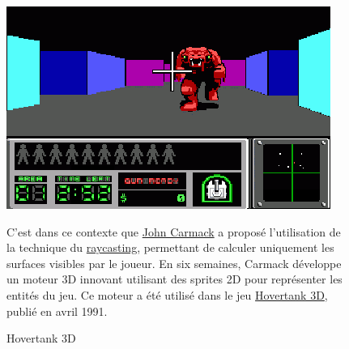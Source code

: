 \documentclass[12pt]{report}
\begin{document}
\begin{figure}[H]
	\begin{minipage}{0.48\textwidth}
		\centering
		\includegraphics[width=\linewidth]{image/Hovertank_3D.png}
		\caption{Hovertank 3D}
		\label{fig:hovertank3d}
	\end{minipage}\hfill
	\begin{minipage}{0.48\textwidth}
		C'est dans ce contexte que \href{https://fr.wikipedia.org/wiki/John_Carmack}{John Carmack} a 
		proposé l'utilisation de la technique du \href{https://fr.wikipedia.org/wiki/Raycasting}{raycasting}, permettant 
		de calculer uniquement les surfaces visibles par le joueur. En six semaines, Carmack développe un moteur 3D innovant 
		utilisant des sprites 2D pour représenter les entités du jeu. Ce moteur a été utilisé dans le jeu 
		\href{https://fr.wikipedia.org/wiki/Hovertank_3D}{Hovertank 3D}, publié en avril 1991.
	\end{minipage}
\end{figure}
\end{document}

